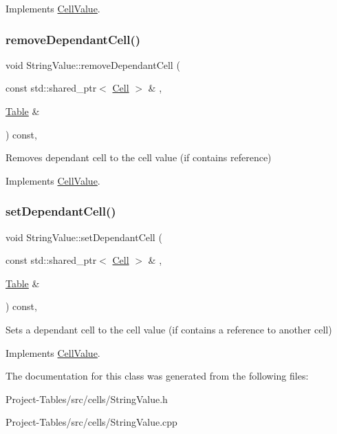 Implements \hyperlink{classCellValue_a12d1cf68a5ba83f0c375441729772742}{Cell\+Value}.

\mbox{\label{classStringValue_aa57e3e4038a415eeb97e09ff8a7bbe35}} 
\subsubsection{\texorpdfstring{remove\+Dependant\+Cell()}{removeDependantCell()}}
{\footnotesize\ttfamily void String\+Value\+::remove\+Dependant\+Cell (\begin{DoxyParamCaption}\item[{const std\+::shared\+\_\+ptr$<$ \hyperlink{classCell}{Cell} $>$ \&}]{,  }\item[{\hyperlink{classTable}{Table} \&}]{ }\end{DoxyParamCaption}) const\hspace{0.3cm}{\ttfamily [override]}, {\ttfamily [virtual]}}

Removes dependant cell to the cell value (if contains reference) 

Implements \hyperlink{classCellValue_a72b4390db6c53e525550cefade66fb0e}{Cell\+Value}.

\mbox{\label{classStringValue_a652b9f611082953f3f6f3938657793d1}} 
\subsubsection{\texorpdfstring{set\+Dependant\+Cell()}{setDependantCell()}}
{\footnotesize\ttfamily void String\+Value\+::set\+Dependant\+Cell (\begin{DoxyParamCaption}\item[{const std\+::shared\+\_\+ptr$<$ \hyperlink{classCell}{Cell} $>$ \&}]{,  }\item[{\hyperlink{classTable}{Table} \&}]{ }\end{DoxyParamCaption}) const\hspace{0.3cm}{\ttfamily [override]}, {\ttfamily [virtual]}}

Sets a dependant cell to the cell value (if contains a reference to another cell) 

Implements \hyperlink{classCellValue_ad2437fb3d4d4a96d9a76c857b3d04231}{Cell\+Value}.



The documentation for this class was generated from the following files\+:\begin{DoxyCompactItemize}
\item 
Project-\/\+Tables/src/cells/String\+Value.\+h\item 
Project-\/\+Tables/src/cells/String\+Value.\+cpp\end{DoxyCompactItemize}
